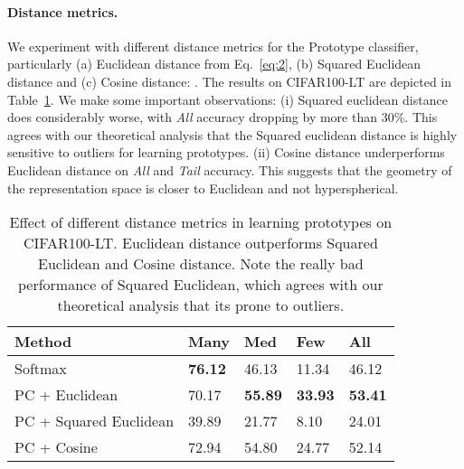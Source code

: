 \documentclass{article}
\begin{document}
\paragraph{Distance metrics.}
We experiment with different distance metrics for the Prototype classifier, particularly (a) Euclidean distance from Eq.~\ref{eq:2}, (b) Squared Euclidean distance and (c) Cosine distance: . The results on CIFAR100-LT are depicted in Table~\ref{tab:table 2}. We make some important observations: (i) Squared euclidean distance does considerably worse, with \textit{All} accuracy dropping by more than 30\%. This agrees with our theoretical analysis that the Squared euclidean distance is highly sensitive to outliers for learning prototypes. (ii) Cosine distance underperforms Euclidean distance on \textit{All} and \textit{Tail} accuracy. This suggests that the geometry of the representation space is closer to Euclidean and not hyperspherical.

\begin{table}[t!]
\begin{tabular}{l | l l l l }
    \toprule
    Method & Many & Med & Few & All \\
    \midrule
    Softmax &  \textbf{76.12} & 46.13 & 11.34 & 46.12  \\
    \midrule
    PC + Euclidean  & 70.17 & \textbf{55.89} & \textbf{33.93} & \textbf{53.41} \\
    PC + Squared Euclidean & 39.89 & 21.77 & 8.10 & 24.01 \\
    PC + Cosine & 72.94 & 54.80 & 24.77 & 52.14 \\
    \bottomrule
    \end{tabular}
    \caption{Effect of different distance metrics in learning prototypes on CIFAR100-LT. Euclidean distance outperforms Squared Euclidean and Cosine distance. Note the really bad performance of Squared Euclidean, which agrees with our theoretical analysis that its prone to outliers.}
    \label{tab:table 2}
\end{table}
\end{document}
